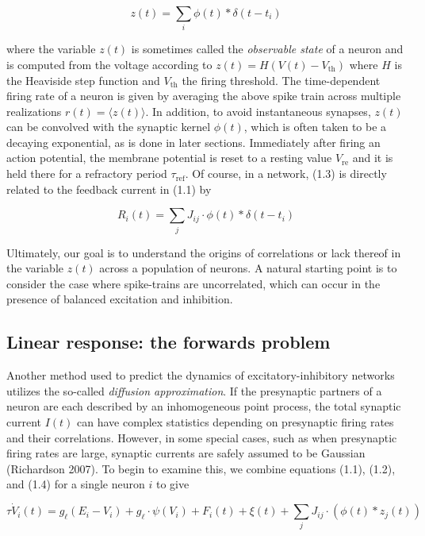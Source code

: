 \documentclass{ucetd}
\begin{document}
\begin{equation}
z(t) = \sum_{i} \phi(t) * \delta(t-t_{i})
\end{equation}

where the variable $z(t)$ is sometimes called the \emph{observable state} of a neuron and is computed from the voltage according to $z(t) = H(V(t) - V_{\mathrm{th}})$ where $H$ is the Heaviside step function and $V_{\mathrm{th}}$ the firing threshold. The time-dependent firing rate of a neuron is given by averaging the above spike train across multiple realizations $r(t) = \langle z(t) \rangle$. In addition, to avoid instantaneous synapses, $z(t)$ can be convolved with the synaptic kernel $\phi(t)$, which is often taken to be a decaying exponential, as is done in later sections. Immediately after firing an action potential, the membrane potential is reset to a resting value $V_{\mathrm{re}}$ and it is held there for a refractory period $\tau_{\mathrm{ref}}$. Of course, in a network, (1.3) is directly related to the feedback current in (1.1) by 

\begin{equation}
R_{i}(t) = \sum_{j} J_{ij}\cdot \phi(t) * \delta(t-t_{i})
\end{equation}

Ultimately, our goal is to understand the origins of correlations or lack thereof in the variable $z(t)$ across a population of neurons. A natural starting point is to consider the case where spike-trains are uncorrelated, which can occur in the presence of balanced excitation and inhibition.

\subsection{Linear response: the forwards problem}

Another method used to predict the dynamics of excitatory-inhibitory networks utilizes the so-called \emph{diffusion approximation}. If the presynaptic partners of a neuron are each described by an inhomogeneous point process, the total synaptic current $I(t)$ can have complex statistics depending on presynaptic firing rates and their correlations. However, in some special cases, such as when presynaptic firing rates are large, synaptic currents are safely assumed to be Gaussian (Richardson 2007). To begin to examine this, we combine equations (1.1), (1.2), and (1.4) for a single neuron $i$ to give 

\begin{equation}
\tau\dot{V}_{i}(t) = g_{\ell}(E_{i} - V_{i}) + g_{\ell}\cdot\psi(V_{i}) + F_{i}(t) + \xi(t) + \sum_{j} J_{ij}\cdot \left(\phi(t) * z_{j}(t)\right)
\end{equation}
\end{document}

